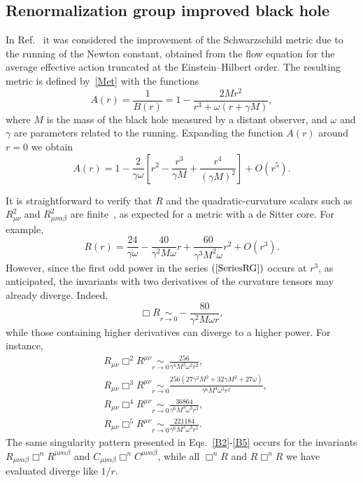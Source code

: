 \documentclass[aps,prd,a4paper,twocolumn,showpacs,showkeys,preprintnumbers,amsmath,amssymb,nofootinbib,usenames,dvipsnames]{revtex4-2}
\newcommand{\be}{\begin{eqnarray}}
\def\beq{\begin{equation}}
\def\eeq{\end{equation}}
\newcommand{\eq}[1]{(\ref{#1})}
\def\al{\alpha}
\def\be{\beta}
\def\ga{\gamma}
\def\om{\omega}
\begin{document}

\subsection{Renormalization group improved black hole}
\label{Reuter-Bonanno}

In Ref.~\cite{Bonanno:2000ep} it was considered the improvement of the Schwarzschild metric due to the running of the Newton constant, obtained
from the flow equation for the average effective action truncated at the Einstein--Hilbert order. The resulting metric is defined by~\eqref{Met} with the functions
%
\beq
A (r) = \frac{1}{B(r)} = 1 - \frac{ 2 M r^2 }{r^3 + \om (r + \ga M)}
\label{ASBH}
,
\eeq
where $M$ is the mass of the black hole measured by a distant observer, and $\om$ and $\ga$ are parameters related to the running. Expanding the function $A(r)$ around $r=0$ we obtain
\beq \label{SeriesRG}
A(r) = 
1 - \frac{2}{\ga \om} \left[ r^2 - \frac{r^3}{\ga  M} + \frac{r^4}{(\ga M)^2 }  \right] + O(r^{5})
.
\eeq

It is straightforward to verify that $R$ and the quadratic-curvature scalars such as $R_{\mu\nu}^2$ and $R_{\mu\nu\al\be}^2$ are finite~\cite{Bonanno:2000ep}, as expected for a metric with a de Sitter core. For example,
%
\beq 
R(r) = \frac{24}{\ga \om}  - \frac{40}{\ga^2 M \om} r + \frac{60}{\ga^3 M^2 \om} r^2  + O(r^3).
\eeq
However, since the first odd power in the series $\eq{SeriesRG}$ occurs at $r^3$, as anticipated, the invariants with two derivatives of the curvature tensors may already diverge. Indeed, 
\beq \label{R-RGI}
\Box R \underset{r \to 0}{\sim} - \frac{80}{\ga^2 M \om r} ,
\eeq
while those containing higher derivatives can diverge to a higher power. For instance,
\begin{align}
&
R_{\mu\nu} \Box^2 R^{\mu\nu} \underset{r \to 0}{\sim} \frac{256}{\ga^4 M^2 \om^2 r^2}
, \label{B2}
\\
&
R_{\mu\nu} \Box^3 R^{\mu\nu} \underset{r \to 0}{\sim} \frac{256 \left(27 \ga^2 M^2+32 \ga M^2+27 \om\right)}{\ga^6 M^4 \om^3 r^2}
, \label{B3}
\\
&
R_{\mu\nu} \Box^4 R^{\mu\nu} \underset{r \to 0}{\sim} \frac{36864}{\ga^6 M^3 \om^3 r^3}
, \label{B4}
\\
&
R_{\mu\nu} \Box^5 R^{\mu\nu} \underset{r \to 0}{\sim} \frac{221184}{\ga^6 M^3 \om^3 r^5}
. \label{B5}
\end{align}
The same singularity pattern presented in Eqs.~\eqref{B2}-\eqref{B5} occurs for the invariants $R_{\mu\nu\al\be} \Box^n R^{\mu\nu\al\be}$ and $C_{\mu\nu\al\be} \Box^n C^{\mu\nu\al\be}$, while all $\Box^n R$ and $R \Box^n R$ we have evaluated diverge like $1/r$.
\end{document}
